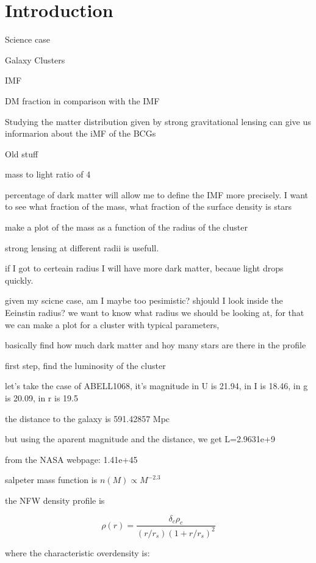 \chapter{Introduction}

Science case

Galaxy Clusters

IMF

DM fraction in comparison with the IMF 

Studying the matter distribution given by strong gravitational lensing can give us informarion about the iMF of the BCGs

Old stuff

mass to light ratio of 4

percentage of dark matter will allow me to define the IMF more precisely. I want to see what fraction of the mass, what fraction of the surface density is stars

make a plot of the mass as a function of the radius of the cluster 

strong lensing at different radii is usefull.

if I got to certeain radius I will have more dark matter, becaue light drops quickly. 

given my scicne case, am I maybe too pesimistic? shjould I look inside the Eeinstin radius? we want to know what radius we should be looking at, for that we can make a plot for a cluster with typical parameters, 

basically find how much dark matter and hoy many stars are there in the profile

first step, find the luminosity of the cluster

let's take the case of ABELL1068, it's magnitude in U is 21.94, in I is 18.46, in g is 20.09, in r is 19.5

the distance to the galaxy is 591.42857 Mpc

but using the aparent magnitude and the distance, we get  L=2.9631e+9

from the NASA webpage: 1.41e+45	

salpeter mass function is $n(M)\propto M^{-2.3}$  

the NFW density profile is 

\begin{equation}
\rho(r)=\frac{\delta_{c}\rho_{c}}{(r/r_{s})(1+r/r_{s})^{2}}
\end{equation}

where the characteristic overdensity is:

